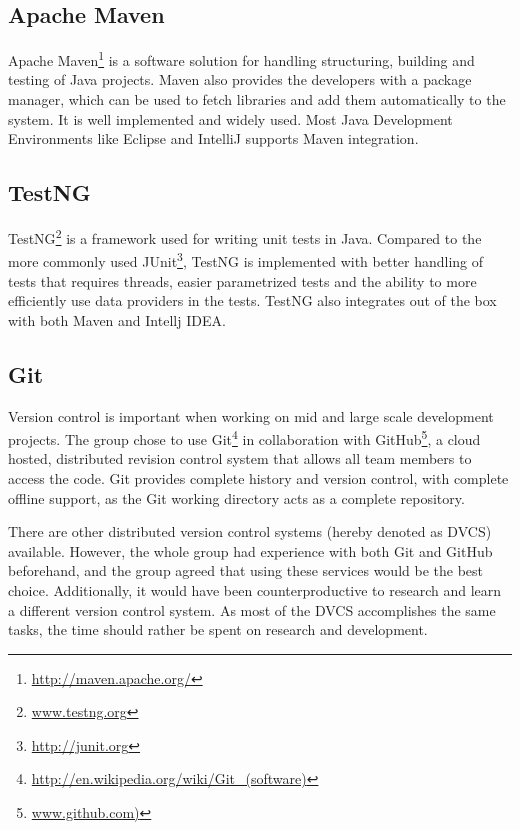 \subsection{Apache Maven}
\label{subsec:prestudies-tools-apache_maven}

Apache Maven\footnote{\url{http://maven.apache.org/}} is a software solution for handling structuring, building and testing of Java projects. Maven also provides the developers with a package manager, which can be used to fetch libraries and add them automatically to the system. It is well implemented and widely used. Most Java Development Environments like Eclipse and IntelliJ supports Maven integration.

\subsection{TestNG}
\label{subsec:prestudies-tools-testng}

TestNG\footnote{\url{www.testng.org}} is a framework used for writing unit tests in Java. Compared to the more commonly used JUnit\footnote{\url{http://junit.org}}, TestNG is implemented with better handling of tests that requires threads, easier parametrized tests and the ability to more efficiently use data providers in the tests. TestNG also integrates out of the box with both Maven and Intellj IDEA.

\subsection{Git}
\label{subsec:prestudies-tools-git}

Version control is important when working on mid and large scale development projects. The group chose to use Git\footnote{\url{http://en.wikipedia.org/wiki/Git_(software)}} in collaboration with GitHub\footnote{\url{www.github.com)}}, a cloud hosted, distributed revision control system that allows all team members to access the code. Git provides complete history and version control, with complete offline support, as the Git working directory acts as a complete repository.

There are other distributed version control systems (hereby denoted as DVCS) available. However, the whole group had experience with both Git and GitHub beforehand, and the group agreed that using these services would be the best choice. Additionally, it would have been counterproductive to research and learn a different version control system. As most of the DVCS accomplishes the same tasks, the time should rather be spent on research and development.

